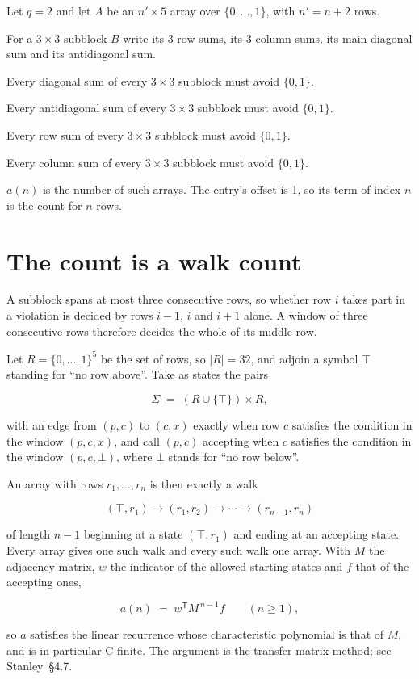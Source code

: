 \documentclass[11pt]{article}
\theoremstyle{definition}
\begin{document}
Let $q = 2$ and let $A$ be an $n' \times 5$ array over $\{0,\dots,1\}$, with $n' = n + 2$ rows.

For a $3\times3$ subblock $B$ write its 3 row sums, its 3 column sums, its main-diagonal sum and its antidiagonal sum.

Every diagonal sum of every $3\times3$ subblock must avoid $\{0, 1\}$.

Every antidiagonal sum of every $3\times3$ subblock must avoid $\{0, 1\}$.

Every row sum of every $3\times3$ subblock must avoid $\{0, 1\}$.

Every column sum of every $3\times3$ subblock must avoid $\{0, 1\}$.

$a(n)$ is the number of such arrays. The entry's offset is 1, so its term of index $n$ is the count for $n$ rows.

\section{The count is a walk count}

A subblock spans at most three consecutive rows, so whether row $i$ takes part in a violation is decided by rows $i-1$, $i$ and $i+1$ alone. A window of three consecutive rows therefore decides the whole of its middle row.

Let $R = \{0,\dots,1\}^{5}$ be the set of rows, so $|R| = 32$, and adjoin a symbol $\top$ standing for ``no row above''. Take as states the pairs

\[\Sigma \;=\; (R \cup \{\top\}) \times R,\]

with an edge from $(p,c)$ to $(c,x)$ exactly when row $c$ satisfies the condition in the window $(p,c,x)$, and call $(p,c)$ accepting when $c$ satisfies the condition in the window $(p,c,\bot)$, where $\bot$ stands for ``no row below''.

An array with rows $r_1,\dots,r_n$ is then exactly a walk

\[(\top,r_1) \to (r_1,r_2) \to \cdots \to (r_{n-1},r_n)\]

of length $n-1$ beginning at a state $(\top,r_1)$ and ending at an accepting state. Every array gives one such walk and every such walk one array. With $M$ the adjacency matrix, $w$ the indicator of the allowed starting states and $f$ that of the accepting ones,

\[a(n) \;=\; w^{\mathsf T} M^{\,n-1} f \qquad (n \ge 1),\]

so $a$ satisfies the linear recurrence whose characteristic polynomial is that of $M$, and is in particular C-finite. The argument is the transfer-matrix method; see Stanley~\S4.7.
\end{document}
